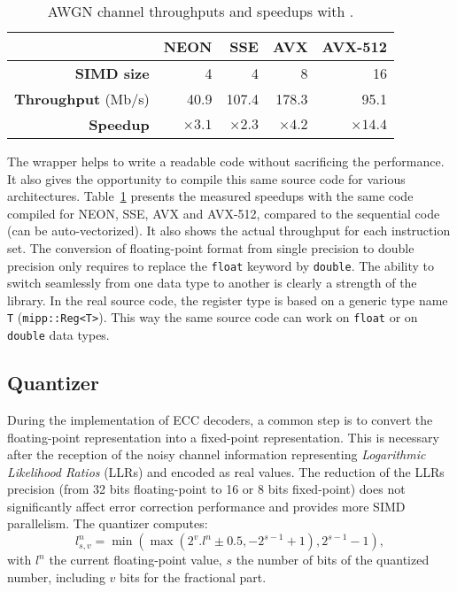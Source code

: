 \begin{table}[htp]
  \centering
  \caption{AWGN channel throughputs and speedups with \MIPP.}
  \label{lst:opt_simu_awgn_speedup}
  \begin{tabular}{r | r  r r r}
                             & \textbf{NEON} & \textbf{SSE} & \textbf{AVX} & \textbf{AVX-512} \\ \hline \hline
  \textbf{SIMD size}         & 4             & 4            & 8            & 16               \\ %
  \textbf{Throughput} (Mb/s) & 40.9          & 107.4        & 178.3        & 95.1             \\ %
  \textbf{Speedup}           & $\times 3.1$  & $\times 2.3$ & $\times 4.2$ & $\times 14.4$    \\
  \end{tabular}
\end{table}

The \MIPP wrapper helps to write a readable code without sacrificing the
performance. It also gives the opportunity to compile this same source code for
various architectures. Table~\ref{lst:opt_simu_awgn_speedup} presents the
measured speedups with the same \MIPP code compiled for NEON, SSE, AVX and
AVX-512, compared to the sequential code (can be auto-vectorized). It also shows
the actual throughput for each instruction set. The conversion of floating-point
format from single precision to double precision only requires to replace the
\verb|float| keyword by \verb|double|. The ability to switch seamlessly from one
data type to another is clearly a strength of the \MIPP library. In the real
source code, the register type is based on a generic type name \verb|T|
(\verb|mipp::Reg<T>|). This way the same source code can work on \verb|float| or
on \verb|double| data types.

\subsection{Quantizer}
\label{sec:opt_simu_quantizer}

During the implementation of ECC decoders, a common step is to convert the
floating-point representation into a fixed-point representation. This is
necessary after the reception of the noisy channel information representing
\textit{Logarithmic Likelihood Ratios} (LLRs) and encoded as real values. The
reduction of the LLRs precision (from 32 bits floating-point to 16 or 8 bits
fixed-point) does not significantly affect error correction performance and
provides more SIMD parallelism. The quantizer computes:
\begin{equation}
\label{eq:opt_simu_quantizer}
l_{s,v}^n = \min(\max(2^v . l^n \pm 0.5, -2^{s-1} +1), 2^{s-1} -1),
\end{equation}
with $l^n$ the current floating-point value, $s$ the number of bits of the
quantized number, including $v$ bits for the fractional part.

